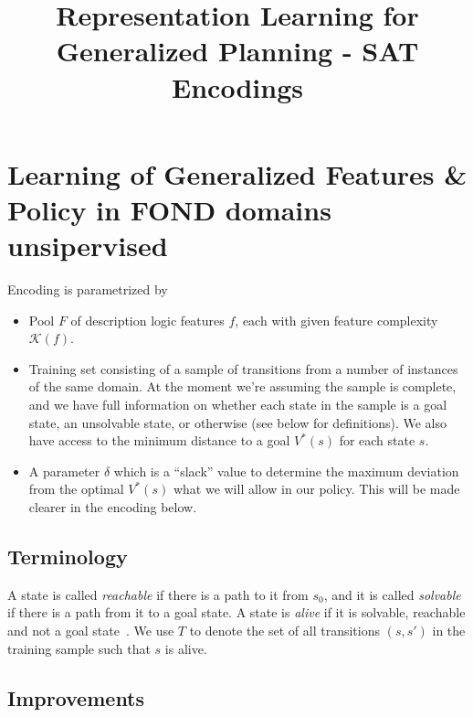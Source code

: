\documentclass[a4paper]{article}
\title{Representation Learning for Generalized Planning - SAT Encodings}
\begin{document}
\maketitle

\section{Learning of Generalized Features \& Policy in FOND domains unsipervised}

Encoding is parametrized by
\begin{itemize}
 \item Pool $F$ of description logic features $f$, each with given feature complexity $\mathcal{K}(f)$.
 \item Training set consisting of a sample of transitions from a number of instances of the same domain.
       At the moment we're assuming the sample is complete, and we have full information on whether each state
       in the sample is a goal state, an unsolvable state, or otherwise (see below for definitions). We also have access
       to the minimum distance to a goal $V^*(s)$ for each state $s$.
 \item A parameter $\delta$ which is a ``slack'' value to determine the maximum deviation from the optimal $V^*(s)$
 what we will allow in our policy. This will be made clearer in the encoding below.
\end{itemize}


\subsection{Terminology}
A state is called \emph{reachable} if there is a path to it from $s_0$, and
it is called \emph{solvable} if there is a path from it to a goal
state.
A state is \emph{alive} if it is solvable, reachable and not a
goal state~\cite{frances-et-al-ijcai2019}.
We use $T$ to denote the set of all transitions $(s, s')$ in the training sample such that $s$ is alive.

\subsection{Improvements}
\end{document}
